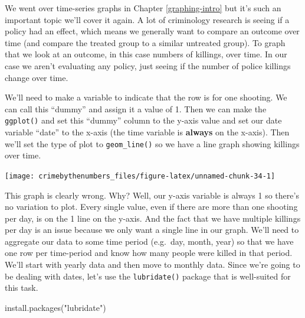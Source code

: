 \documentclass[
]{krantz}
\makeatletter
\newenvironment{Shaded}{\begin{snugshade}}{\end{snugshade}}
\newcommand{\AttributeTok}[1]{\textcolor[rgb]{0.61,0.61,0.61}{#1}}
\newcommand{\DecValTok}[1]{\textcolor[rgb]{0.06,0.06,0.06}{#1}}
\newcommand{\FunctionTok}[1]{\textcolor[rgb]{0,0,0}{#1}}
\newcommand{\NormalTok}[1]{#1}
\newcommand{\OtherTok}[1]{\textcolor[rgb]{0.37,0.37,0.37}{#1}}
\newcommand{\SpecialCharTok}[1]{\textcolor[rgb]{0,0,0}{#1}}
\newcommand{\StringTok}[1]{\textcolor[rgb]{0.5,0.5,0.5}{#1}}
\newenvironment{kframe}{%
\medskip{}
\setlength{\fboxsep}{.8em}
 \def\at@end@of@kframe{}%
 \ifinner\ifhmode%
  \def\at@end@of@kframe{\end{minipage}}%
  \begin{minipage}{\columnwidth}%
 \fi\fi%
 \def\FrameCommand##1{\hskip\@totalleftmargin \hskip-\fboxsep
 \colorbox{shadecolor}{##1}\hskip-\fboxsep
     \hskip-\linewidth \hskip-\@totalleftmargin \hskip\columnwidth}%
 \MakeFramed {\advance\hsize-\width
   \@totalleftmargin\z@ \linewidth\hsize
   \@setminipage}}%
 {\par\unskip\endMakeFramed%
 \at@end@of@kframe}
\renewenvironment{Shaded}{\begin{kframe}}{\end{kframe}}
\makeatother
\begin{document}
We went over time-series graphs in Chapter \ref{graphing-intro} but it's such an important topic we'll cover it again. A lot of criminology research is seeing if a policy had an effect, which means we generally want to compare an outcome over time (and compare the treated group to a similar untreated group). To graph that we look at an outcome, in this case numbers of killings, over time. In our case we aren't evaluating any policy, just seeing if the number of police killings change over time.

We'll need to make a variable to indicate that the row is for one shooting. We can call this ``dummy'' and assign it a value of 1. Then we can make the \texttt{ggplot()} and set this ``dummy'' column to the y-axis value and set our date variable ``date'' to the x-axis (the time variable is \textbf{always} on the x-axis). Then we'll set the type of plot to \texttt{geom\_line()} so we have a line graph showing killings over time.

\begin{Shaded}
\end{Shaded}

\begin{center}\texttt{[image: crimebythenumbers\_files/figure-latex/unnamed-chunk-34-1]} \end{center}

This graph is clearly wrong. Why? Well, our y-axis variable is always 1 so there's no variation to plot. Every single value, even if there are more than one shooting per day, is on the 1 line on the y-axis. And the fact that we have multiple killings per day is an issue because we only want a single line in our graph. We'll need to aggregate our data to some time period (e.g.~day, month, year) so that we have one row per time-period and know how many people were killed in that period. We'll start with yearly data and then move to monthly data. Since we're going to be dealing with dates, let's use the \texttt{lubridate()} package that is well-suited for this task.

\begin{Shaded}
\begin{Highlighting}[]
\FunctionTok{install.packages}\NormalTok{(}\StringTok{"lubridate"}\NormalTok{)}
\end{Highlighting}
\end{Shaded}
\end{document}

